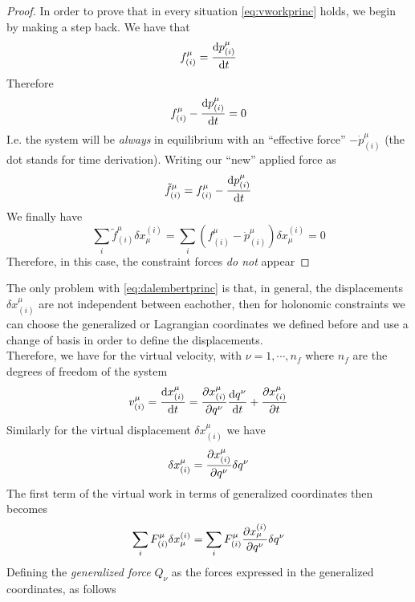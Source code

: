 \documentclass[../admech.tex]{subfiles}
\begin{document}
\begin{proof}
	In order to prove that in every situation \eqref{eq:vworkprinc} holds, we begin by making a step back. We have that
	\begin{equation*}
		f^\mu_{(i)}=\dv{p^\mu_{(i)}}{t}
	\end{equation*}
	Therefore
	\begin{equation*}
		f^\mu_{(i)}-\dv{p^\mu_{(i)}}{t}=0
	\end{equation*}
	I.e. the system will be \emph{always} in equilibrium with an ``effective force'' $-\dot{p}^\mu_{(i)}$ (the dot stands for time derivation).
	Writing our ``new'' applied force as
	\begin{equation*}
		\tilde{f}^\mu_{(i)}=f^\mu_{(i)}-\dv{p^\mu_{(i)}}{t}
	\end{equation*}
	We finally have
	\begin{equation}
		\sum_i\tilde{f}^\mu_{(i)}\delta x_\mu^{(i)}=\sum_i\left( f^\mu_{(i)}-\dot{p}^\mu_{(i)} \right)\delta x_\mu^{(i)}=0
		\label{eq:dalprproof}
	\end{equation}
	Therefore, in this case, the constraint forces \emph{do not} appear
\end{proof}
The only problem with \eqref{eq:dalembertprinc} is that, in general, the displacements $\delta x^\mu_{(i)}$ are not independent between eachother, then for holonomic constraints we can choose the generalized or Lagrangian coordinates we defined before and use a change of basis in order to define the displacements.\\
Therefore, we have for the virtual velocity, with $\nu=1,\cdots,n_f$ where $n_f$ are the degrees of freedom of the system
\begin{equation}
	v^\mu_{(i)}=\dv{x^\mu_{(i)}}{t}=\pdv{x^\mu_{(i)}}{q^\nu}\dv{q^\nu}{t}+\pdv{x^\mu_{(i)}}{t}
	\label{eq:vvellag}
\end{equation}
Similarly for the virtual displacement $\delta x^\mu_{(i)}$ we have
\begin{equation}
	\delta x^\mu_{(i)}=\pdv{x^\mu_{(i)}}{q^\nu}\delta q^\nu
	\label{eq:vdisplag}
\end{equation}
The first term of the virtual work in terms of generalized coordinates then becomes
\begin{equation}
	\sum_iF^\mu_{(i)}\delta x^{(i)}_\mu=\sum_i F^\mu_{(i)}\pdv{x_\mu^{(i)}}{q^\nu}\delta q^\nu
	\label{eq:vworklag}
\end{equation}
Defining the \emph{generalized force} $Q_\nu$ as the forces expressed in the generalized coordinates, as follows
\end{document}
